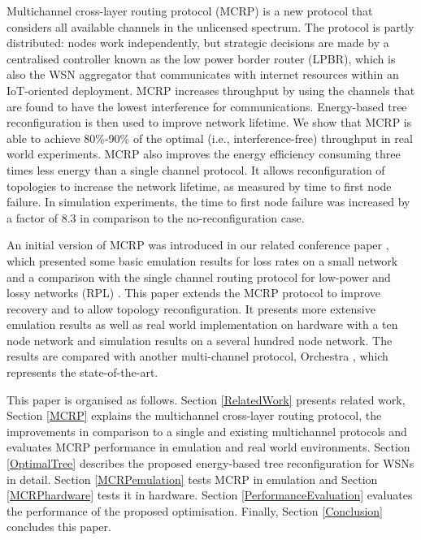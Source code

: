 Multichannel cross-layer routing protocol (MCRP) is a new protocol that considers all available channels in the unlicensed spectrum. The protocol is partly distributed: nodes work independently, but strategic decisions are made by a centralised controller known as the low power border router (LPBR), which is also the WSN aggregator that communicates with internet resources within an IoT-oriented deployment. MCRP increases throughput by using the channels that are found to have the lowest interference for communications.
Energy-based tree reconfiguration is then used to improve network lifetime.  We show that MCRP is able to achieve 80\%-90\% of the optimal (i.e., interference-free) throughput in real world experiments.
MCRP also improves the energy efficiency consuming three times less energy than a single channel protocol.  It allows reconfiguration of topologies to increase the network lifetime, as measured by time to first node failure.  In simulation experiments, the time to first node failure was increased by a factor of 8.3 in comparison to the no-reconfiguration case.

An initial version of MCRP was introduced in our related conference paper \cite{mcrp}, which presented some basic emulation results for loss rates on a small network and a comparison with the single channel routing protocol for low-power and lossy networks (RPL) \cite{winter2012rpl}.  This paper extends the MCRP protocol to improve recovery and to allow topology reconfiguration.  It presents more extensive emulation results as well as real world implementation on hardware with a ten node network and simulation results on a several hundred node network.  The results are compared with another multi-channel protocol, Orchestra \cite{orchestra}, which represents the state-of-the-art.

This paper is organised as follows. Section \ref{RelatedWork} presents  related work, Section \ref{MCRP} explains the multichannel cross-layer routing protocol, the improvements in comparison to a single and existing multichannel protocols and evaluates MCRP performance in emulation and real world environments.
Section \ref{OptimalTree} describes the proposed energy-based tree reconfiguration for WSNs in detail.  Section \ref{MCRPemulation} tests MCRP in emulation and Section \ref{MCRPhardware} tests it in hardware.
Section \ref{PerformanceEvaluation} evaluates the performance of the proposed optimisation. Finally, Section \ref{Conclusion} concludes this paper.
